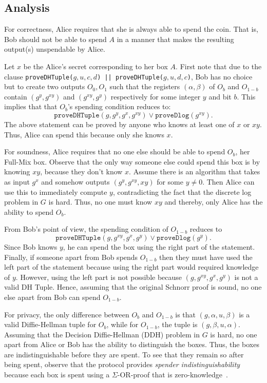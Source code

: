 \documentclass[runningheads]{llncs}
\begin{document}
\subsection{Analysis}

For correctness, Alice requires that she is always able to spend the coin. That is, Bob should not be able to spend $A$ in a manner that makes the resulting output(s) unspendable by Alice.

Let $x$ be the Alice's secret corresponding to her box $A$. First note that due to the clause 
\texttt{proveDHTuple($g, u, c, d$) || proveDHTuple($g, u, d, c$)}, Bob has no choice but to create two outputs $O_0, O_1$ such that the registers $(\alpha, \beta)$ of $O_b$ and $O_{1-b}$ contain $(g^y, g^{xy})$ and $(g^{xy}, g^y)$ respectively for some integer $y$ and bit $b$. This implies that that $O_b$'s spending condition reduces to:
$$\texttt{proveDHTuple}(g, g^{y}, g^x, g^{xy}) \lor \texttt{proveDlog}(g^{xy}).$$ 
The above statement can be proved by anyone who knows at least one of $x$ or $xy$. 
Thus, Alice can spend this because only she knows $x$. 

For soundness, Alice requires that no one else should be able to spend $O_b$, her Full-Mix box. Observe that the only way someone else could spend this box is by knowing $xy$, because they don't know $x$. Assume there is an algorithm that takes as input $g^x$ and somehow outputs $(g^y, g^{xy}, xy)$ for some $y \neq 0$. Then Alice can use this to immediately compute $y$, contradicting the fact that the discrete log problem in $G$ is hard. Thus, no one must know $xy$ and thereby, only Alice has the ability to spend $O_b$.

From Bob's point of view, the spending condition of $O_{1-b}$ reduces to 
$$\texttt{proveDHTuple}(g, g^{xy}, g^x, g^{y}) \lor \texttt{proveDlog}(g^{y}).$$
Since Bob knows $y$, he can spend the box using the right part of the statement. Finally, if someone apart from Bob spends $O_{1-b}$ then they must have used the left part of the statement because using the right part would required knowledge of $y$. However, using the left part is not possible because $(g, g^{xy}, g^x, g^{y})$ is not a valid DH Tuple. Hence, assuming that the original Schnorr proof is sound, no one else apart from Bob can spend $O_{1-b}$.

For privacy, the only difference between $O_b$ and $O_{1-b}$ is that $(g, \alpha, u, \beta)$ is a valid Diffie-Hellman tuple for $O_b$, while for $O_{1-b}$, the tuple is $(g, \beta, u, \alpha)$. Assuming that the Decision Diffie-Hellman (DDH) problem in $G$ is hard, no one apart from Alice or Bob has the ability to distinguish the boxes.
Thus, the boxes are indistinguishable before they are spent. To see that they remain so after being spent, observe that the protocol provides {\em spender indistinguishability} because each box is spent using a $\Sigma$-OR-proof that is zero-knowledge~\cite{Dam10}. 
\end{document}

